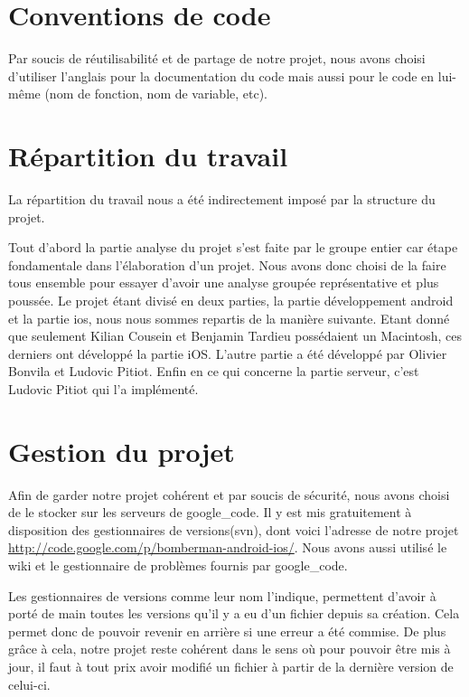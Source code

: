 \section{Conventions de code}
	Par soucis de réutilisabilité et de partage de notre projet, 
	nous avons choisi d'utiliser l'anglais pour la documentation du code mais aussi 
	pour le code en lui-même (nom de fonction, nom de variable, etc).


\section{Répartition du travail}
	La répartition du travail nous a été indirectement imposé par la structure du projet. 
	
	Tout d'abord la partie analyse du projet s'est faite par le groupe entier car
	étape fondamentale dans l'élaboration d'un projet. Nous avons donc choisi de
	la faire tous ensemble pour essayer d'avoir une analyse groupée représentative
	et plus poussée. 
	Le projet étant divisé en deux parties, la partie développement \gls{android}
	et la partie \gls{ios}, nous nous sommes repartis de la manière suivante.
	Etant donné que seulement Kilian Cousein et Benjamin Tardieu possédaient un
	Macintosh, ces derniers ont développé la partie iOS. L'autre partie a été
	développé par Olivier Bonvila et Ludovic Pitiot. 
	Enfin en ce qui concerne la partie serveur, c'est Ludovic Pitiot qui l'a implémenté.
	
	
\section{Gestion du projet}
	Afin de garder notre projet cohérent et par soucis de sécurité, nous avons
	choisi de le stocker sur les serveurs de \gls{google_code}. Il y est mis
	gratuitement à disposition des gestionnaires de versions(\gls{svn}), dont voici
	l'adresse de notre projet \url{http://code.google.com/p/bomberman-android-ios/}. 
	Nous avons aussi utilisé le wiki et le gestionnaire de problèmes fournis par
	\gls{google_code}.
	
	Les gestionnaires de versions comme leur nom l'indique, permettent d'avoir à
	porté de main toutes les versions qu'il y a eu d'un fichier depuis sa
	création. Cela permet donc de pouvoir revenir en arrière si une erreur a été
	commise. De plus grâce à cela, notre projet reste cohérent dans le sens où
	pour pouvoir être mis à jour, il faut à tout prix avoir modifié un fichier à
	partir de la dernière version de celui-ci.
		
